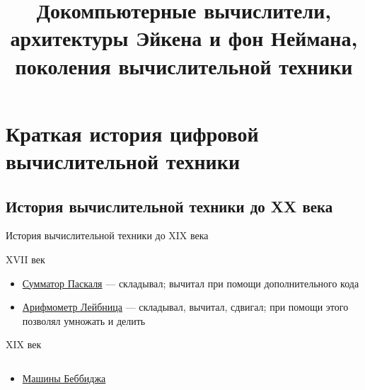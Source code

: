 \documentclass[xetex,aspectratio=43]{beamer}
\title[Докомпьютерные, Эйкен, фон Нейман]{Докомпьютерные вычислители,\\ архитектуры Эйкена и фон Неймана,\\поколения вычислительной техники}
\begin{document}
\titleslide

\tocslide

\section{Краткая история цифровой
		вычислительной техники}

\subsection{История вычислительной техники до XX века}

\begin{frame}{История вычислительной техники до XIX века}
	\begin{block}{XVII век}
		\begin{itemize}
			\item
			\href{https://en.wikipedia.org/wiki/Pascal\%27s_calculator\#Addition}{Сумматор
				Паскаля} --- складывал; вычитал при помощи дополнительного кода
			\item
			\href{https://en.wikipedia.org/wiki/Stepped_reckoner\#Operation}{Арифмометр
				Лейбница} --- складывал, вычитал, сдвигал; при помощи этого позволял
			умножать и делить
		\end{itemize}
	\end{block}

	\pause

	\begin{block}{XIX век}
		\begin{columns}
		\begin{column}{0.7\textwidth}
			\begin{itemize}
				\item
				\href{https://en.wikipedia.org/wiki/Charles_Babbage\#Computing_pioneer}{Машины
					Беббиджа}


\end{itemize}
\end{column}
\end{columns}
\end{block}
\end{frame}
\end{document}
